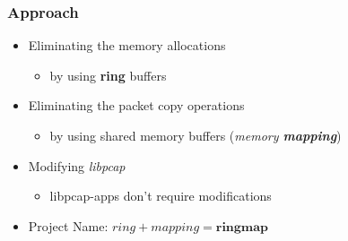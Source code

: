 \begin{frame}
\frametitle{Approach}
\begin{itemize}
	\item<2-> Eliminating the memory allocations
		\begin{itemize}
			\item<2-> by using \textbf{ring} buffers
		\end{itemize}

	\item<3-> Eliminating the packet copy operations
		\begin{itemize}
			\item<3-> by using shared memory buffers (\emph{memory \textbf{mapping}})
		\end{itemize}
	\item<4-> Modifying \emph{libpcap}
		\begin{itemize}
			\item<4-> libpcap-apps don't require modifications\newline
		\end{itemize}
	\item<5->[$\Rightarrow$] Project Name: $ring + mapping = \textbf{ringmap}$
\end{itemize}
\end{frame}


